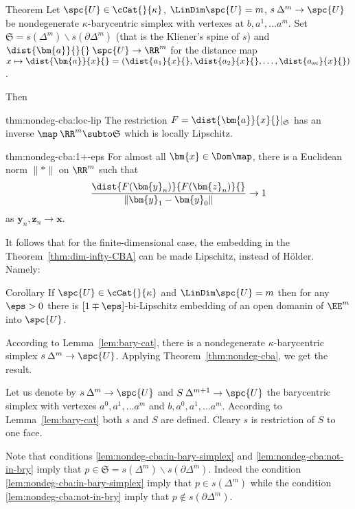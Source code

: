 \begin{thm}{Theorem}\label{thm:nondeg-cba}
Let $\spc{U}\in\cCat{}{\kappa}$, 
$\LinDim\spc{U}=m$,
$s\:\Delta^m\to\spc{U}$ be nondegenerate $\kappa$-barycentric simplex
with vertexes at $b,a^1,\dots a^m$.
Set $\mathfrak{S}=s(\Delta^m)\backslash s(\partial\Delta^m)$
(that is the Kliener's spine of $s$)
and $\dist{\bm{a}}{}{}\:\spc{U}\to\RR^m$ for the distance map 
$x\mapsto \dist{\bm{a}}{x}{}=(\dist{a_1}{x}{},\dist{a_2}{x}{},\dots,\dist{a_m}{x}{})$.

Then 
\begin{subthm}{thm:nondeg-cba:loc-lip}
The restriction $F=\dist{\bm{a}}{x}{}|_{\mathfrak{S}}$ has an inverse 
$\map\:\RR^m\subto\mathfrak{S}$ which is locally Lipschitz.
\end{subthm}

\begin{subthm}{thm:nondeg-cba:1+-eps}
For almost all $\bm{x}\in \Dom\map$,
there is a Euclidean norm $\|{*}\|$ on $\RR^m$ 
such that 
$$\frac{\dist{F(\bm{y}_n)}{F(\bm{z}_n)}{}}{\|\bm{y}_1-\bm{y}_0\|}\to 1$$
as $\bm{y}_n,\bm{z}_n\to\bm{x}$.
\end{subthm}
\end{thm}

It follows that for the finite-dimensional case, 
the embedding in the Theorem~\ref{thm:dim-infty-CBA} can be made Lipschitz,
instead of H\"older.
Namely:

\begin{thm}{Corollary}\label{cor:dim-finite-CBA}
If $\spc{U}\in\cCat{}{\kappa}$ and  $\LinDim\spc{U}=m$
then for any $\eps>0$ 
there is $[1\mp\eps]$-bi-Lipschitz embedding 
of an open domanin of $\EE^m$ 
into $\spc{U}$.
\end{thm}

According to Lemma~\ref{lem:bary-cat},
there is a nondegenerate $\kappa$-barycentric simplex $s\:\Delta^m\to \spc{U}$.
Applying Theorem~\ref{thm:nondeg-cba},
we get the result.
\qeds




Let us denote by $s\:\Delta^m\to \spc{U}$ and $S\:\Delta^{m+1}\to \spc{U}$ the barycentric simplex with vertexes $a^0,a^1,\dots a^m$ and 
$b,a^0,a^1,\dots a^m$.
According to Lemma~\ref{lem:bary-cat} both $s$ and $S$ are defined.
Cleary $s$ is restriction of $S$ to one face.

Note that conditions \ref{lem:nondeg-cba:in-bary-simplex} and \ref{lem:nondeg-cba:not-in-bry} 
imply that $p\in \mathfrak{S}=s(\Delta^m)\backslash s(\partial\Delta^m)$.
Indeed the condition \ref{lem:nondeg-cba:in-bary-simplex} imply that $p\in s(\Delta^m)$ 
while the condition \ref{lem:nondeg-cba:not-in-bry} imply that $p\not\in s(\partial\Delta^m)$.
\qeds
















